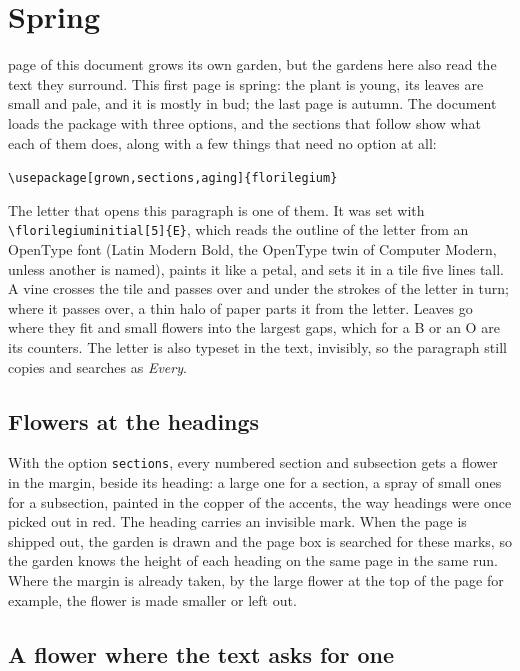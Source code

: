 \documentclass[11pt,a4paper]{article}
\newcommand\code[1]{\texttt{\small #1}}
\begin{document}
\section{Spring}

 page of this document grows its own garden, but the
gardens here also read the text they surround. This first page is spring: the plant is
young, its leaves are small and pale, and it is mostly in bud; the last page is autumn.
The document loads the package with three options, and the sections that follow show what
each of them does, along with a few things that need no option at all:
\begin{center}\code{\textbackslash usepackage[grown,sections,aging]\{florilegium\}}\end{center}

The letter that opens this paragraph is one of them. It was set with
\code{\textbackslash florilegiuminitial[5]\{E\}}, which reads the outline of the letter from an OpenType font (Latin
Modern Bold, the OpenType twin of Computer Modern, unless another is named), paints it
like a petal, and sets it in a tile five lines tall. A vine crosses the tile and passes
over and under the strokes of the letter in turn; where it passes over, a thin halo of
paper parts it from the letter. Leaves go where they fit and small flowers into the
largest gaps, which for a B or an O are its counters. The letter is also typeset in the
text, invisibly, so the paragraph still copies and searches as \emph{Every}.

\subsection{Flowers at the headings}

With the option \code{sections}, every numbered section and subsection gets a flower in the
margin, beside its heading: a large one for a section, a spray of small ones for a
subsection, painted in the copper of the accents, the way headings were once picked out in
red. The heading carries an invisible mark. When the page is shipped out, the
garden is drawn and the page box is searched for these marks, so the garden knows the
height of each heading on the same page in the same run. Where the margin is already
taken, by the large flower at the top of the page for example, the flower is made
smaller or left out.

\subsection{A flower where the text asks for one}
\end{document}
